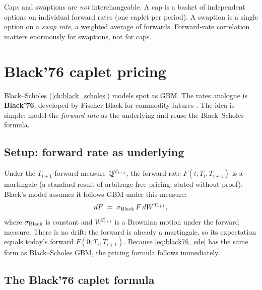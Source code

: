\begin{pitfallbox}
Caps and swaptions are \emph{not} interchangeable.  A cap is a basket
of independent options on individual forward rates (one caplet per
period).  A swaption is a single option on a \emph{swap rate}, a
weighted average of forwards.  Forward-rate correlation matters
enormously for swaptions, not for caps.
\end{pitfallbox}


\section{Black'76 caplet pricing}
\label{sec:black76}

Black--Scholes (\cref{ch:black_scholes}) models spot as GBM.  The
rates analogue is \textbf{Black'76}, developed by Fischer Black for
commodity futures \citeBlackSF.  The idea is simple: model the
\emph{forward rate} as the underlying and reuse the Black--Scholes
formula.

\subsection{Setup: forward rate as underlying}

Under the $T_{i+1}$-forward measure $\mathbb{Q}^{T_{i+1}}$, the forward rate
$F(t; T_i, T_{i+1})$ is a martingale (a standard result of
arbitrage-free pricing; stated without proof).  Black's model assumes
it follows GBM under this measure:
\begin{equation}
  dF \;=\; \sigma_{\text{Black}}\, F\, dW^{T_{i+1}},
  \label{eq:black76_sde}
\end{equation}
where $\sigma_{\text{Black}}$ is constant and $W^{T_{i+1}}$ is a
Brownian motion under the forward measure.  There is no drift: the
forward is already a martingale, so its expectation equals today's
forward $F(0; T_i, T_{i+1})$.  Because \cref{eq:black76_sde} has the
same form as Black--Scholes GBM, the pricing formula follows
immediately.

\subsection{The Black'76 caplet formula}

